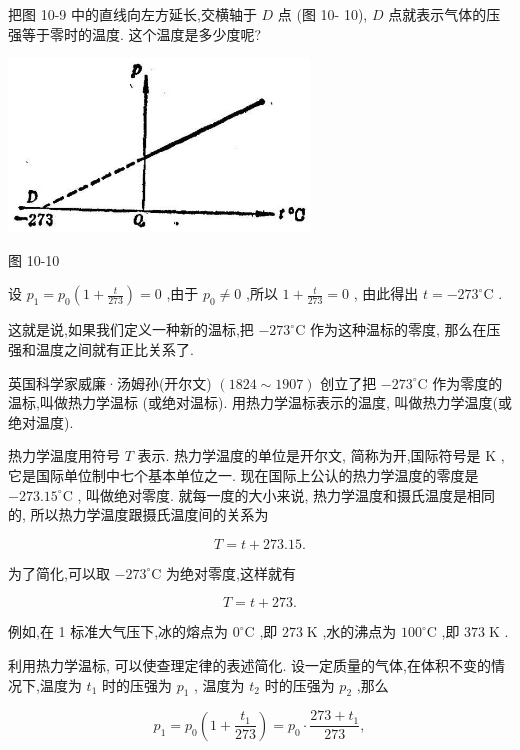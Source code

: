 \documentclass[10pt]{article}
\begin{document}
把图 10-9 中的直线向左方延长,交横轴于 \(D\) 点 (图 10- 10), \(D\) 点就表示气体的压强等于零时的温度. 这个温度是多少度呢?

\begin{center}
\includegraphics[max width=0.6\textwidth]{images/01912d55-147c-70aa-b0e0-1782a122f948_291_352656.jpg}
\end{center}

图 10-10

设 \({p}_{1} = {p}_{0}\left( {1 + \frac{t}{273}}\right) = 0\) ,由于 \({p}_{0} \neq 0\) ,所以 \(1 + \frac{t}{273} = 0\) , 由此得出 \(t = - {273}^{ \circ }\mathrm{C}\) .

这就是说,如果我们定义一种新的温标,把 \(- {273}^{ \circ }\mathrm{C}\) 作为这种温标的零度, 那么在压强和温度之间就有正比关系了.

英国科学家威廉·汤姆孙(开尔文) \(\left( {{1824} \sim {1907}}\right)\) 创立了把 \(- {273}^{ \circ }\mathrm{C}\) 作为零度的温标,叫做热力学温标 (或绝对温标). 用热力学温标表示的温度, 叫做热力学温度(或绝对温度).

热力学温度用符号 \(T\) 表示. 热力学温度的单位是开尔文, 简称为开,国际符号是 \(\mathrm{K}\) ,它是国际单位制中七个基本单位之一. 现在国际上公认的热力学温度的零度是 \(- {273.15}^{ \circ }\mathrm{C}\) , 叫做绝对零度. 就每一度的大小来说, 热力学温度和摄氏温度是相同的, 所以热力学温度跟摄氏温度间的关系为

\[
T = t + {273.15}.
\]

为了简化,可以取 \(- {273}^{ \circ }\mathrm{C}\) 为绝对零度,这样就有

\[
T = t + {273}\text{.}
\]

例如,在 1 标准大气压下,冰的熔点为 \({0}^{ \circ }\mathrm{C}\) ,即 \({273}\mathrm{\;K}\) ,水的沸点为 \({100}^{ \circ }\mathrm{C}\) ,即 \({373}\mathrm{\;K}\) .

利用热力学温标, 可以使查理定律的表述简化. 设一定质量的气体,在体积不变的情况下,温度为 \({t}_{1}\) 时的压强为 \({p}_{1}\) , 温度为 \({t}_{2}\) 时的压强为 \({p}_{2}\) ,那么

\[
{p}_{1} = {p}_{0}\left( {1 + \frac{{t}_{1}}{273}}\right) = {p}_{0} \cdot \frac{{273} + {t}_{1}}{273},
\]
\end{document}
